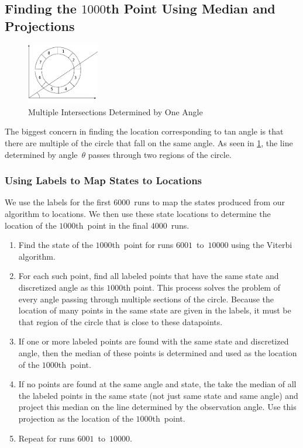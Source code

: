 \documentclass[twoside]{article}
\begin{document}
\subsection{Finding the $\num{1000}$th Point Using Median and Projections}\label{sec:find-num1000th-point}

\begin{figure}
  \begin{center}
    \includegraphics[width=0.28\textwidth]{images/two-intersection}
    \caption[multi-intersect]{Multiple Intersections Determined by One Angle}\label{fig:multi-intersect}
  \end{center}
\end{figure}
The biggest concern in finding the location corresponding to tan angle is that there are multiple of the circle that fall on the same angle.
As seen in \cref{fig:multi-intersect}, the line determined by angle~$\theta$ passes through two regions of the circle.

\subsubsection{Using Labels to Map States to Locations}\label{sec:using-labels-map}

We use the labels for the first $\num{6000}$~runs to map the states produced from our algorithm to locations.
We then use these state locations to determine the location of the $\num{1000}$th~point in the final $\num{4000}$~runs.
\begin{enumerate}
\item Find the state of the $\num{1000}$th~point for runs $\num{6001}$~to~$\num{10000}$ using the Viterbi algorithm.
\item For each such point, find all labeled points that have the same state and discretized angle as this $\num{1000}$th point.
  This process solves the problem of every angle passing through multiple sections of the circle.
  Because the location of many points in the same state are given in the labels, it must be that region of the circle that is close to these datapoints.
\item If one or more labeled points are found with the same state and discretized angle, then the median of these points is determined and used as the location of the $\num{1000}$th~point.
\item If no points are found at the same angle and state, the take the median of all the labeled points in the same state (not just same state and same angle) and project this median on the line determined by the observation angle.
  Use this projection as the location of the $\num{1000}$th~point.
\item Repeat for runs $\num{6001}$~to~$\num{10000}$.
\end{enumerate}
\end{document}
